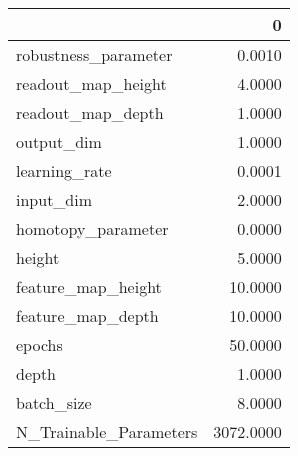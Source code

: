 \begin{tabular}{lr}
\toprule
{} &          0 \\
\midrule
robustness\_parameter   &     0.0010 \\
readout\_map\_height     &     4.0000 \\
readout\_map\_depth      &     1.0000 \\
output\_dim             &     1.0000 \\
learning\_rate          &     0.0001 \\
input\_dim              &     2.0000 \\
homotopy\_parameter     &     0.0000 \\
height                 &     5.0000 \\
feature\_map\_height     &    10.0000 \\
feature\_map\_depth      &    10.0000 \\
epochs                 &    50.0000 \\
depth                  &     1.0000 \\
batch\_size             &     8.0000 \\
N\_Trainable\_Parameters &  3072.0000 \\
\bottomrule
\end{tabular}
